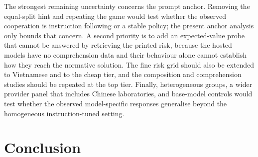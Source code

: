 \documentclass[openacc]{rsproca_new}
\begin{document}
The strongest remaining uncertainty concerns the prompt anchor. Removing the equal-split hint and repeating the game would test whether the observed cooperation is instruction following or a stable policy; the present anchor analysis only bounds that concern. A second priority is to add an expected-value probe that cannot be answered by retrieving the printed risk, because the hosted models have no comprehension data and their behaviour alone cannot establish how they reach the normative solution. The fine risk grid should also be extended to Vietnamese and to the cheap tier, and the composition and comprehension studies should be repeated at the top tier. Finally, heterogeneous groups, a wider provider panel that includes Chinese laboratories, and base-model controls would test whether the observed model-specific responses generalise beyond the homogeneous instruction-tuned setting.

\section{Conclusion}
\end{document}
